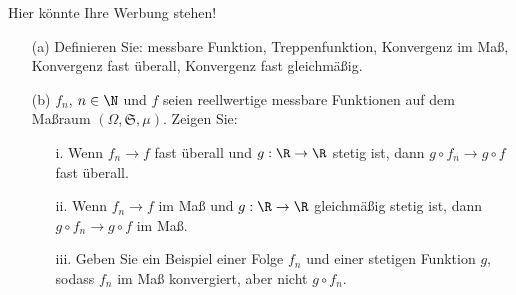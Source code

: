 \begin{exercise}

Hier könnte Ihre Werbung stehen!

\begin{itemize}
  \item[(a)] Definieren Sie: messbare Funktion, Treppenfunktion, Konvergenz im Maß, Konvergenz fast überall, Konvergenz fast gleichmäßig.
  \item[(b)] $f_n$, $n \in \N$ und $f$ seien reellwertige messbare Funktionen auf dem Maßraum $(\Omega, \mathfrak{S}, \mu)$. Zeigen Sie:
  \begin{itemize}
    \item[i.] Wenn $f_n \to f$ fast überall und $g: \R \to \R$ stetig ist, dann $g \circ f_n \to g \circ f$ fast überall.
    \item[ii.] Wenn $f_n \to f$ im Maß und $g: \R \to \R$ gleichmäßig stetig ist, dann $g \circ f_n \to g \circ f$ im Maß.
    \item[iii.] Geben Sie ein Beispiel einer Folge $f_n$ und einer stetigen Funktion $g$, sodass $f_n$ im Maß konvergiert, aber nicht $g \circ f_n$.
  \end{itemize}
\end{itemize}

\end{exercise}


